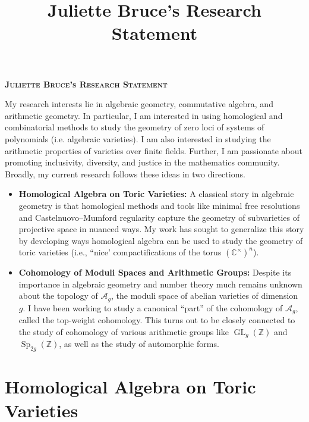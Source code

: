 \documentclass[11pt,reqno]{amsart}
\title{Juliette Bruce's Research Statement}
\theoremstyle{remark}
\newcommand{\GL}{{\operatorname{GL}}}
\newcommand{\Sp}{\operatorname{Sp}}
\newcommand{\cA}{\mathcal{A}}
\newcommand{\C}{\mathbb{C}}
\newcommand{\Z}{\mathbb{Z}}
\begin{document}
 

\begingroup  
  \centering
  \large\scshape\bfseries Juliette Bruce's Research Statement\\[1em]
\endgroup


\setcounter{section}{0}

My research interests lie in algebraic geometry, commutative algebra, and arithmetic geometry. In particular, I am interested in using homological and combinatorial methods to study the geometry of zero loci of systems of polynomials (i.e. algebraic varieties). I am also interested in studying the arithmetic properties of varieties over finite fields. Further, I am passionate about promoting inclusivity, diversity, and justice in the mathematics community. Broadly, my current research follows these ideas in two directions. 

\begin{itemize}[leftmargin=*]
\item \textbf{Homological Algebra on Toric Varieties:} A classical story in algebraic geometry is that homological methods and tools like minimal free resolutions and Castelnuovo--Mumford  regularity capture the geometry of subvarieties of projective space in nuanced ways. My work has sought to generalize this story by developing ways homological algebra can be used to study the geometry of toric varieties (i.e., ``nice' compactifications of the torus $(\C^{\times})^{n}$). 

\item \textbf{Cohomology of Moduli Spaces and Arithmetic Groups:} Despite its importance in algebraic geometry and number theory much remains unknown about the topology of $\cA_{g}$, the moduli space of abelian varieties of dimension $g$. I have been working to study a canonical ``part'' of the cohomology of $\mathcal{A}_{g}$, called the top-weight cohomology. This turns out to be closely connected to the study of cohomology of various arithmetic groups like $\GL_{g}(\Z)$ and $\Sp_{2g}(\Z)$, as well as the study of automorphic forms. 

\end{itemize}

\section{Homological Algebra on Toric Varieties}
\end{document}
